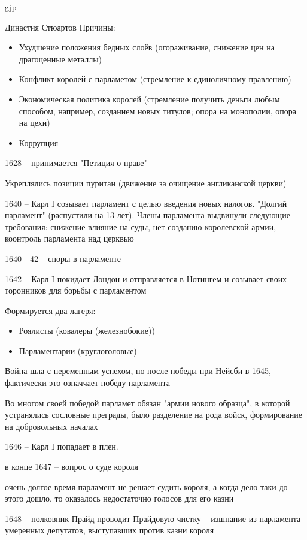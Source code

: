 gjp	 \documentclass[12pt,a4paper]{article}
\begin{document}
\begin{enumerate}
	Династия Стюартов
	Причины:
	\begin{itemize}
		\item Ухудшение положения бедных слоёв (огораживание, снижение цен на драгоценные металлы)
		\item Конфликт королей с парламетом (стремление к единоличному правлению)
		\item Экономическая политика королей (стремление получить деньги любым способом, например, созданием новых титулов; опора на монополии, опора на цехи)
		\item Коррупция	
	\end{itemize}
	
	1628 -- принимается "Петиция о праве"
	
	Укреплялись позиции пуритан (движение за очищение англиканской церкви)
	
	1640 -- Карл I созывает парламент с целью введения новых налогов. "Долгий парламент" (распустили на 13 лет). Члены парламента выдвинули следующие требования: снижение влияние на суды, нет созданию королевской армии, коонтроль парламента над церквью
	
	1640 - 42 -- споры в парламенте
	
	1642 -- Карл I покидает Лондон и отправляется в Нотингем и созывает своих торонников для борьбы с парламентом
	
	Формируется два лагеря:
	\begin{itemize}
		\item Роялисты (ковалеры (железнобокие)) 
		\item Парламентарии (круглоголовые)
	\end{itemize}
	
	Война шла с переменным успехом, но после победы при Нейсби в 1645, фактически это означчает победу парламента
	
	Во многом своей победой парламет обязан "армии нового образца", в которой устранялись сословные преграды, было разделение на рода войск, формирование на добровольных началах
	
	1646 -- Карл I попадает в плен.
	
	в конце 1647 -- вопрос о суде короля
	
	очень долгое время парламент не решает судить короля, а когда дело таки до этого дошло, то оказалось недостаточно голосов для его казни
	
	1648 -- полковник Прайд проводит Прайдовую чистку -- изшнание из парламента умеренных депутатов, выступавших против казни короля
	

\end{enumerate}
\end{document}
